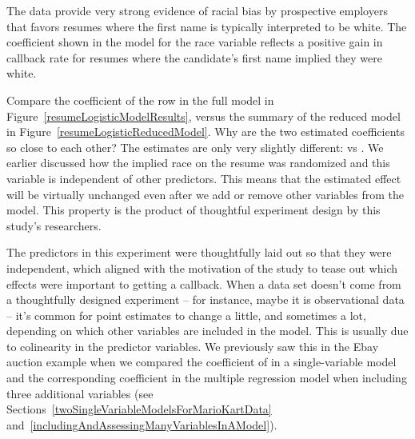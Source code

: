 The data provide very strong evidence of racial bias
by prospective employers that favors resumes where the
first name is typically interpreted to be white.
The coefficient shown in the model for the
race variable reflects a positive gain in callback
rate for resumes where the candidate's first name
implied they were white.

\begin{examplewrap}
\begin{nexample}{Compare the coefficient of the
     row in the full model in
    Figure~\ref{resumeLogisticModelResults},
    versus the summary of the reduced model in
    Figure~\ref{resumeLogisticReducedModel}.
    Why are the two estimated coefficients so
    close to each other?}
  The estimates are only very slightly different:
  \resRaceWhiteCoefReduced{} vs \resRaceWhiteCoef{}.
  We earlier discussed how the implied race on the resume
  was randomized and this variable is independent of
  other predictors.
  This means that the estimated effect will be virtually
  unchanged even after we add or remove other variables
  from the model.
  This property is the product of thoughtful experiment
  design by this study's researchers.
\end{nexample}
\end{examplewrap}

The predictors in this experiment were thoughtfully
laid out so that they were independent,
which aligned with the motivation of the study to tease
out which effects were important to getting a callback.
When a data set doesn't come from a thoughtfully designed
experiment -- for instance, maybe it is observational data --
it's common for point estimates to change a little,
and sometimes a lot, depending on which other
variables are included in the model.
This is usually due to colinearity in the predictor variables.
We previously saw this in the Ebay auction example when
we compared the coefficient of  in a
single-variable model and the corresponding coefficient
in the multiple regression model when including three
additional variables (see
Sections~\ref{twoSingleVariableModelsForMarioKartData}
and~\ref{includingAndAssessingManyVariablesInAModel}).

